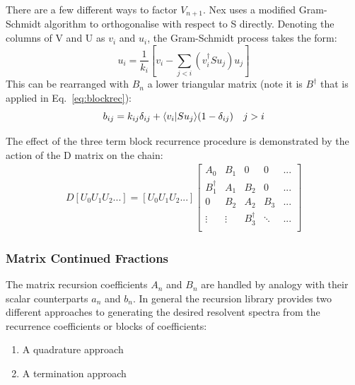 There are a few different ways to factor $V_{n+1}$. Nex
uses a modified Gram-Schmidt algorithm to orthogonalise 
with respect to S directly. Denoting the columns of V and U
as $v_{i}$ and $u_{i}$, the Gram-Schmidt process takes the
form:
%
\begin{equation}
u_{i} = \frac{1}{k_{i}}[v_{i} - \sum_{j < i}(v^{\dagger}_{i}Su_{j})u_{j}]
\end{equation}
%
This can be rearranged with $B_{n}$ a lower triangular 
matrix (note it is $B^{\dagger}$ that is applied 
in Eq.~\ref{eq:blockrec}):
%
\begin{equation}
b_{ij} = k_{ij}\delta_{ij} + \langle v_{i}|Su_{j}\rangle (1-\delta_{ij}) \quad j>i
\end{equation}

The effect of the three term block recurrence procedure
is demonstrated by the action of the D matrix on the 
chain:
%
\begin{align*}
D\left[U_{0}U_{1}U_{2}...\right] = [U_{0}U_{1}U_{2}...] 
                  \begin{bmatrix}       A_{0}           & B_{1}  & 0                &   0    & ...  \\
                                        B_{1}^{\dagger} & A_{1}  & B_{2}            &   0    & ...  \\
                                        0               & B_{2}  & A_{2}            & B_{3}  & ...  \\
                                        \vdots          & \vdots & B^{\dagger}_{3}  & \ddots & ...  \\
                  \end{bmatrix}
\end{align*}
%

\subsubsection{Matrix Continued Fractions}
The matrix recursion coefficients $A_{n}$ and $B_{n}$ are handled by
analogy with their scalar counterparts $a_{n}$ and $b_{n}$. 
In general the recursion library provides two 
different approaches to generating 
the desired resolvent spectra from the 
recurrence coefficients or blocks of coefficients:
%
\begin{enumerate}
\item A quadrature approach
\item A termination approach
\end{enumerate}
%

